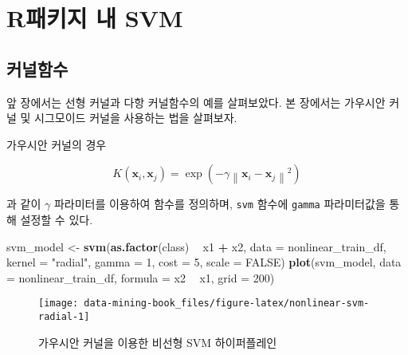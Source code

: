 \documentclass[]{book}
\newenvironment{Shaded}{\begin{snugshade}}{\end{snugshade}}
\newcommand{\DataTypeTok}[1]{\textcolor[rgb]{0.13,0.29,0.53}{#1}}
\newcommand{\DecValTok}[1]{\textcolor[rgb]{0.00,0.00,0.81}{#1}}
\newcommand{\KeywordTok}[1]{\textcolor[rgb]{0.13,0.29,0.53}{\textbf{#1}}}
\newcommand{\NormalTok}[1]{#1}
\newcommand{\OperatorTok}[1]{\textcolor[rgb]{0.81,0.36,0.00}{\textbf{#1}}}
\newcommand{\OtherTok}[1]{\textcolor[rgb]{0.56,0.35,0.01}{#1}}
\newcommand{\StringTok}[1]{\textcolor[rgb]{0.31,0.60,0.02}{#1}}
\begin{document}
\hypertarget{svm-r-pkg}{%
\section{R패키지 내 SVM}\label{svm-r-pkg}}

\hypertarget{svm-kernel-function}{%
\subsection{커널함수}\label{svm-kernel-function}}

앞 장에서는 선형 커널과 다항 커널함수의 예를 살펴보았다. 본 장에서는 가우시안 커널 및 시그모이드 커널을 사용하는 법을 살펴보자.

가우시안 커널의 경우

\begin{equation*}
K(\mathbf{x}_i, \mathbf{x}_j) = \exp \left( -\gamma \left\lVert \mathbf{x}_i - \mathbf{x}_j \right\rVert^2 \right)
\end{equation*}

과 같이 \(\gamma\) 파라미터를 이용하여 함수를 정의하며, \texttt{svm} 함수에 \texttt{gamma} 파라미터값을 통해 설정할 수 있다.

\begin{Shaded}
\begin{Highlighting}[]
\NormalTok{svm_model <-}\StringTok{ }\KeywordTok{svm}\NormalTok{(}\KeywordTok{as.factor}\NormalTok{(class) }\OperatorTok{~}\StringTok{ }\NormalTok{x1 }\OperatorTok{+}\StringTok{ }\NormalTok{x2, }\DataTypeTok{data =}\NormalTok{ nonlinear_train_df, }
                 \DataTypeTok{kernel =} \StringTok{"radial"}\NormalTok{, }\DataTypeTok{gamma =} \DecValTok{1}\NormalTok{,}
                 \DataTypeTok{cost =} \DecValTok{5}\NormalTok{, }\DataTypeTok{scale =} \OtherTok{FALSE}\NormalTok{)}
\KeywordTok{plot}\NormalTok{(svm_model, }\DataTypeTok{data =}\NormalTok{ nonlinear_train_df, }\DataTypeTok{formula =}\NormalTok{ x2 }\OperatorTok{~}\StringTok{ }\NormalTok{x1, }\DataTypeTok{grid =} \DecValTok{200}\NormalTok{)}
\end{Highlighting}
\end{Shaded}

\begin{figure}

{\centering \texttt{[image: data-mining-book\_files/figure-latex/nonlinear-svm-radial-1]} 

}

\caption{가우시안 커널을 이용한 비선형 SVM 하이퍼플레인}\label{fig:nonlinear-svm-radial}
\end{figure}
\end{document}
